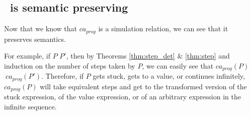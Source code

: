 \subsection{\caname\ is semantic preserving}\label{sxn:ca_sem_pres}

Now that we know that $ca_{prog}$ is a simulation relation, we can see that it preserves semantics. 

For example, if $P$ \trstep $P'$, then by Theorems \ref{thm:step_det} \& \ref{thm:step} and induction on the number of steps taken by $P$, we can easily see that $ca_{prog}(P)$ \trstep $\ ca_{prog}(P')$. Therefore, if $P$ gets stuck, gets to a value, or continues infinitely, $ca_{prog}(P)$ will take equivalent steps and get to the transformed version of the stuck expression, of the value expression, or of an arbitrary expression in the infinite sequence.